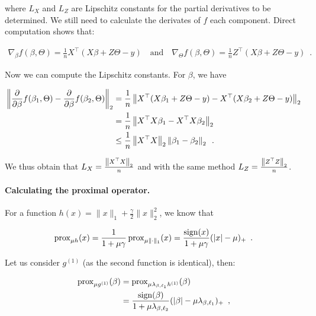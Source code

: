 \documentclass[a4]{article}
\begin{document}
where $L_X$ and $L_Z$ are Lipschitz constants for the partial derivatives to be determined.
We still need to calculate the derivates of $f$ \wrt each component. Direct computation shows that:

\begin{align}
	\nabla_{\beta}f(\beta, \Theta) = \frac{1}{n}X^\top (X\beta + Z\Theta - y)
	\quad \text{and} \quad
	\nabla_{\Theta}f(\beta, \Theta) = \frac{1}{n}Z^\top (X\beta + Z\Theta -y)\enspace.
\end{align}

Now we can compute the Lipschitz constants. For $\beta$, we have

\begin{align*}
\left \lVert \frac{\partial}{\partial \beta}f(\beta_1, \Theta) - \frac{\partial}{\partial \beta}f(\beta_2, \Theta) \right \rVert_2
												& = \frac{1}{n} \left \lVert  X^\top(X\beta_1 + Z\Theta - y) - X^\top(X\beta_2 + Z\Theta - y)  \right \rVert_2 \\
												& = \frac{1}{n} \left \lVert  X^\top X\beta_1 - X^\top X\beta_2  \right \rVert_2 \\
												& \leq \frac{1}{n} \left \lVert  X^\top X  \right \rVert_2 \left \lVert  \beta_1-\beta_2  \right \rVert_2  \enspace.
\end{align*}

We thus obtain that $L_X = \frac{\left \lVert  X^\top X  \right \rVert_2}{n}$ and with the same method $L_Z = \frac{\left \lVert  Z^\top Z  \right \rVert_2}{n}$.


\paragraph{Calculating the proximal operator.}

For a function $h(x)=\|x\|_1 + \frac{\gamma}{2}\|x\|_2^2$, we know \citep[p.~189]{Parikh14} that

\[
\operatorname{prox}_{\mu h}(x) = \dfrac{1}{1 + \mu\gamma}\operatorname{prox}_{\mu \|\cdot\|_1}(x) = \dfrac{\operatorname{sign}(x)}{1 + \mu\gamma}(|x| - \mu)_+\enspace.
\]

Let us consider $g^{(1)}$ (as the second function is identical), then:

\begin{align}\label{par:proxi}
	\operatorname{prox}_{\mu g^{(1)}}(\beta) & = \operatorname{prox}_{\mu\lambda_{\beta, \ell_1}{h^{(1)}}}(\beta)                                              \\
	                               & = \dfrac{\operatorname{sign}(\beta)}{1 + \mu \lambda_{\beta,\ell_2}}(|\beta| - \mu\lambda_{\beta, \ell_1})_+\enspace,
\end{align}
\end{document}
